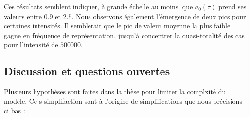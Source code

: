 \noindent Ces résultats semblent indiquer, à grande échelle au moins, que $a_0(\tau)$ prend ses valeurs entre $0.9$ et $2.5$. Nous observons également l’émergence de deux pics pour certaines intensités. Il semblerait que le pic de valeur moyenne la plus faible gagne en fréquence de représentation, jusqu’à concentrer la quasi-totalité des cas pour l’intensité de $500 000$.




\subsection{Discussion et questions ouvertes}

Plusieurs hypothèses sont faites dans la thèse pour limiter la complxité du modèle. Ce
s simplifaction sont à l'origine de simplifications que nous précisions ci bas :
